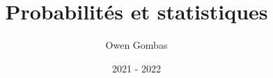 \documentclass[french,a4paper,11pt]{report}
\title{Probabilités et statistiques}
\author{Owen Gombas}
\date{2021 - 2022}
\begin{document}
\maketitle
\tableofcontents{}


\end{document}
